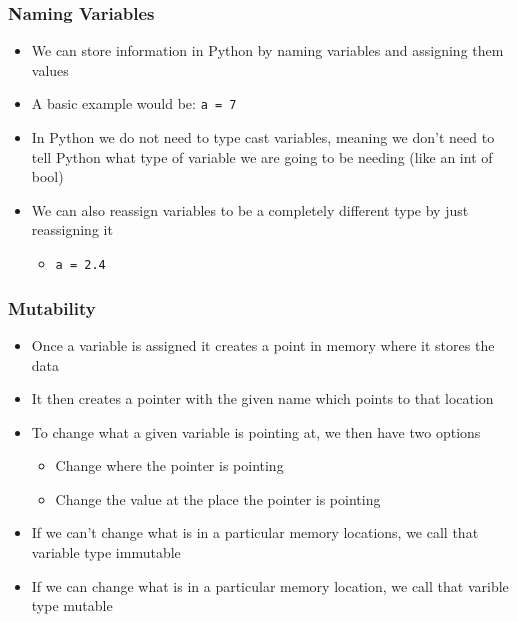 \documentclass[mini frame in current subsection]{beamer}
\begin{document}
		\begin{frame}
			\frametitle{Naming Variables}
			\begin{itemize}
				\vfill\item  We can store information in Python by naming variables and assigning them values
				\vfill\item  A basic example would be:  \texttt{a = 7}
				
				\vfill\item  In Python we do not need to type cast variables, meaning we don't need to tell Python what type of variable we are going to be needing (like an int of bool)
				
				\vfill\item  We can also reassign variables to be a completely different type by just reassigning it
					\begin{itemize}
						\item  \texttt{a = 2.4}
					\end{itemize}
			\end{itemize}
		\end{frame}
		
		
	
		\begin{frame}
			\frametitle{Mutability}
			\begin{itemize}
				\vfill\item  Once a variable is assigned it creates a point in memory where it stores the data
				\vfill\item  It then creates a pointer with the given name which points to that location
				\vfill\item  To change what a given variable is pointing at, we then have two options
					\begin{itemize}
						\item  Change where the pointer is pointing
						\item  Change the value at the place the pointer is pointing
					\end{itemize}
				\vfill\item  If we can't change what is in a particular memory locations, we call that variable type immutable
				\vfill\item  If we can change what is in a particular memory location, we call that varible type mutable
			\end{itemize}
		\end{frame}
		
\end{document}

